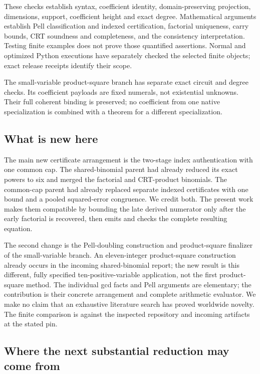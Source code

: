 \documentclass[11pt]{article}
\theoremstyle{definition}\newtheorem{definition}[theorem]{Definition}
\theoremstyle{remark}\newtheorem{remark}[theorem]{Remark}
\begin{document}
These checks establish syntax, coefficient identity, domain-preserving projection, dimensions, support, coefficient height and exact degree. Mathematical arguments establish Pell classification and indexed certification, factorial uniqueness, carry bounds, CRT soundness and completeness, and the consistency interpretation. Testing finite examples does not prove those quantified assertions. Normal and optimized Python executions have separately checked the selected finite objects; exact release receipts identify their scope.

The small-variable product-square branch has separate exact circuit and degree checks. Its coefficient payloads are fixed numerals, not existential unknowns. Their full coherent binding is preserved; no coefficient from one native specialization is combined with a theorem for a different specialization.

\subsection{What is new here}

The main new certificate arrangement is the two-stage index authentication with one common cap. The shared-binomial parent had already reduced its exact powers to six and merged the factorial and CRT-product binomials. The common-cap parent had already replaced separate indexed certificates with one bound and a pooled squared-error congruence. We credit both. The present work makes them compatible by bounding the late derived numerator only after the early factorial is recovered, then emits and checks the complete resulting equation.

The second change is the Pell-doubling construction and product-square finalizer of the small-variable branch. An eleven-integer product-square construction already occurs in the incoming shared-binomial report; the new result is this different, fully specified ten-positive-variable application, not the first product-square method. The individual gcd facts and Pell arguments are elementary; the contribution is their concrete arrangement and complete arithmetic evaluator. We make no claim that an exhaustive literature search has proved worldwide novelty. The finite comparison is against the inspected repository and incoming artifacts at the stated pin.

\subsection{Where the next substantial reduction may come from}
\end{document}
